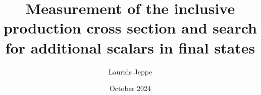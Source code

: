 \documentclass  [
  paper    = a4,
  BCOR     = 10mm,
  twoside, %
  openany,  %
  headsepline, %
  bibliography=totoc,
  fontsize = 12pt,
  toc      = bibnumbered,
  numbers  = noendperiod,
  headings = normal,
  listof   = leveldown]
  {scrbook}
\title{Measurement of the inclusive \ttbar production cross section and search for additional scalars in \ttbar final states
}
\author{Laurids Jeppe}
\date{October 2024}
\begin{document}
\maketitle

\newpage
\tableofcontents
\newpage

















\begin{appendix}
\thispagestyle{empty}


\end{appendix}
\end{document}
